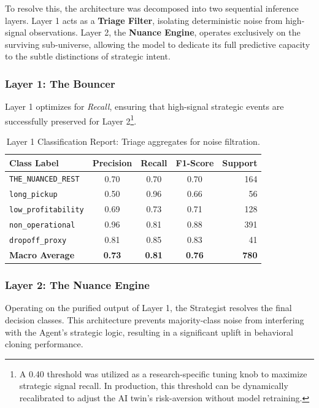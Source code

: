 \documentclass[10pt, letterpaper]{article}
\begin{document}
To resolve this, the architecture was decomposed into two sequential inference layers. Layer 1 acts as a \textbf{Triage Filter}, isolating deterministic noise from high-signal observations. Layer 2, the \textbf{Nuance Engine}, operates exclusively on the surviving sub-universe, allowing the model to dedicate its full predictive capacity to the subtle distinctions of strategic intent.

\subsubsection{Layer 1: The Bouncer}
Layer 1 optimizes for \textit{Recall}, ensuring that high-signal strategic events are successfully preserved for Layer 2\footnote{A 0.40 threshold was utilized as a research-specific tuning knob to maximize strategic signal recall. In production, this threshold can be dynamically recalibrated to adjust the AI twin's risk-aversion without model retraining.}.

\begin{table}[H]
    \centering
    \small
    \begin{tabular}{l c c c r}
        \toprule
        \textbf{Class Label} & \textbf{Precision} & \textbf{Recall} & \textbf{F1-Score} & \textbf{Support} \\
        \midrule
        \texttt{THE\_NUANCED\_REST} & 0.70 & 0.70 & 0.70 & 164 \\ \addlinespace[2pt]
        \texttt{long\_pickup}        & 0.50 & 0.96 & 0.66 & 56  \\ \addlinespace[2pt]
        \texttt{low\_profitability}  & 0.69 & 0.73 & 0.71 & 128 \\ \addlinespace[2pt]
        \texttt{non\_operational}     & 0.96 & 0.81 & 0.88 & 391 \\ \addlinespace[2pt]
        \texttt{dropoff\_proxy}      & 0.81 & 0.85 & 0.83 & 41  \\ \addlinespace[4pt]
        \midrule
        \textbf{Macro Average}       & \textbf{0.73} & \textbf{0.81} & \textbf{0.76} & \textbf{780} \\
        \bottomrule
    \end{tabular}
    \caption{Layer 1 Classification Report: Triage aggregates for noise filtration.}
    \label{tab:layer1_report}
\end{table}

\subsubsection{Layer 2: The Nuance Engine}
Operating on the purified output of Layer 1, the Strategist resolves the final decision classes. This architecture prevents majority-class noise from interfering with the Agent's strategic logic, resulting in a significant uplift in behavioral cloning performance.
\end{document}
